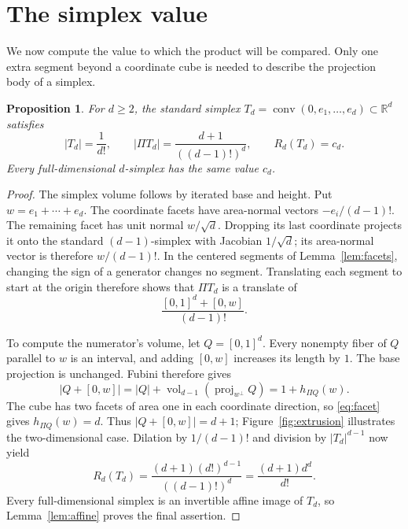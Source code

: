 \documentclass[11pt]{article}
\newtheorem{proposition}[theorem]{Proposition}
\newcommand{\R}{\mathbb R}
\DeclareMathOperator{\conv}{conv}
\DeclareMathOperator{\vol}{vol}
\DeclareMathOperator{\proj}{proj}
\begin{document}
\section{The simplex value}\label{sec:simplex}

We now compute the value to which the product will be compared.
Only one extra segment beyond a coordinate cube is needed to describe
the projection body of a simplex.

\begin{proposition}\label{prop:simplex}
For \(d\ge2\), the standard simplex
\(T_d=\conv(0,e_1,\ldots,e_d)\subset\R^d\) satisfies
\[
 |T_d|=\frac1{d!},\qquad
 |\Pi T_d|=\frac{d+1}{((d-1)!)^d},\qquad
 R_d(T_d)=c_d.
\]
Every full-dimensional \(d\)-simplex has the same value \(c_d\).
\end{proposition}

\begin{proof}
The simplex volume follows by iterated base and height. Put
\(w=e_1+\cdots+e_d\). The coordinate facets have area-normal vectors
\(-e_i/(d-1)!\). The remaining facet has unit normal \(w/\sqrt d\).
Dropping its last coordinate projects it onto the standard
\((d-1)\)-simplex with Jacobian \(1/\sqrt d\); its area-normal vector is
therefore \(w/(d-1)!\). In the centered segments of
Lemma~\ref{lem:facets}, changing the sign of a generator changes no
segment. Translating each segment to start at the origin therefore shows
that \(\Pi T_d\) is a translate of
\[
 \frac{[0,1]^d+[0,w]}{(d-1)!}.
\]

To compute the numerator's volume, let \(Q=[0,1]^d\).
Every nonempty fiber of \(Q\) parallel to \(w\) is an interval, and
adding \([0,w]\) increases its length by \(1\).
The base projection is unchanged. Fubini therefore gives
\[
 |Q+[0,w]|
 =|Q|+\vol_{d-1}(\proj_{w^\perp}Q)
 =1+h_{\Pi Q}(w).
\]
The cube has two facets of area one in each coordinate direction,
so \eqref{eq:facet} gives \(h_{\Pi Q}(w)=d\).
Thus \(|Q+[0,w]|=d+1\); Figure~\ref{fig:extrusion} illustrates the
two-dimensional case. Dilation by \(1/(d-1)!\) and division by
\(|T_d|^{d-1}\) now yield
\[
 R_d(T_d)=\frac{(d+1)(d!)^{d-1}}{((d-1)!)^d}
         =\frac{(d+1)d^d}{d!}.
\]
Every full-dimensional simplex is an invertible affine image of
\(T_d\), so Lemma~\ref{lem:affine} proves the final assertion.
\end{proof}
\end{document}
